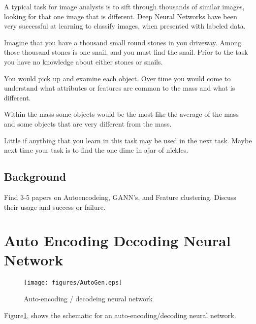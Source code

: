 \documentclass{article}
\begin{document}
A typical task for image analysts is to sift through thousands of similar images, looking
for that one image that is different. Deep Neural Networks have been very successful at
learning to classify images, when presented with labeled data.

Imagine that you have a thousand small round stones in you driveway.
Among those thousand stones is one snail, and you must find the snail.
Prior to the task you have no knowledge about either stones or snails.

You would pick up and examine each object. Over time you would come to
understand what attributes or features are common to the mass and what is different.

Within the mass some objects would be the most like the average of the mass and some
objects that are very different from the mass.

Little if anything that you learn in this task may be used in the next task. Maybe next time
your task is to find the one dime in ajar of nickles.


\subsection{Background\label{sec:back}}

Find 3-5 papers on Autoencodeing, GANN's, and Feature clustering. Discuss their usage and success or failure.

\newpage

\section{Auto Encoding Decoding Neural Network\label{sec:autoencoder}}

\begin{figure}
  \begin{center}
    \texttt{[image: figures/AutoGen.eps]}
    \caption{Auto-encoding / decodeing neural network}
    \label{fig:threelayer}
  \end{center}
\end{figure}

Figure\ref{fig:threelayer}, shows the schematic for an auto-encoding/decoding neural network.
\end{document}
